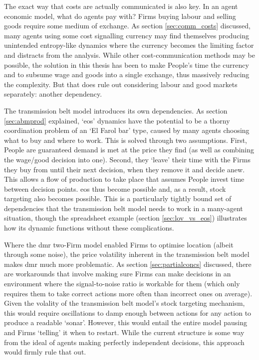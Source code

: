 The exact way that costs are actually communicated is also key. In an agent economic model, what do agents pay with? Firms buying labour and selling goods require some medium of exchange. As section \ref{sec:comm_costs} discussed, many agents using some cost signalling currency may find themselves producing unintended entropy-like dynamics where the currency becomes the limiting factor and distracts from the analysis. While other cost-communication methods may be possible, the solution in this thesis has been to make People's time the currency and to subsume wage and goods into a single exchange, thus massively reducing the complexity. But that does rule out considering labour and good markets separately: another dependency.

The transmission belt model introduces its own dependencies. As section \ref{sec:abmprod} explained, `\gls{eos}' dynamics have the potential to be a thorny coordination problem of an `El Farol bar' type, caused by many agents choosing what to buy and where to work. This is solved through two assumptions. First, People are guaranteed demand is met at the price they find (as well as combining the wage/good decision into one). Second, they `leave' their time with the Firms they buy from until their next decision, when they remove it and decide anew. This allows a flow of production to take place that assumes People invest time between decision points. \Gls{eos} thus become possible and, as a result, stock targeting also becomes possible. This is a particularly tightly bound set of dependencies that the transmission belt model needs to work in a many-agent situation, though the spreadsheet example (section \ref{sec:lov_vs_eos}) illustrates how its dynamic functions without these complications.

Where the \gls{dmr} two-Firm model enabled Firms to optimise location (albeit through some noise), the price volatility inherent in the transmission belt model makes \gls{dmr} much more problematic. As section \ref{sec:partialconcs} discussed, there are workarounds that involve making sure Firms can make decisions in an environment where the signal-to-noise ratio is workable for them (which only requires them to take correct actions more often than incorrect ones on average). Given the volality of the transmission belt model's stock targeting mechanism, this would require oscillations to damp enough between actions for any action to produce a readable `sonar'. However, this would entail the entire model pausing and Firms `telling' it when to restart. While the current structure is some way from the ideal of agents making perfectly independent decisions, this approach would firmly rule that out.

